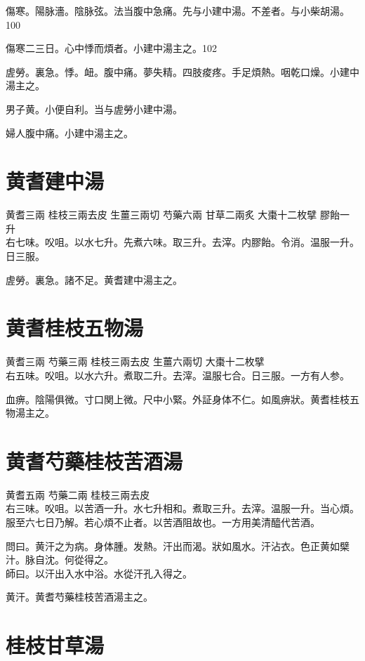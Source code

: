 傷寒。陽脉濇。陰脉弦。法当腹中急痛。先与小建中湯。不差者。与小柴胡湯。100

傷寒二三日。心中悸而煩者。小建中湯主之。102

虗勞。裏急。悸。衄。腹中痛。夢失精。四肢痠疼。手足煩熱。咽乾口燥。小建中湯主之。

男子黄。小便自利。当与虗勞小建中湯。

婦人腹中痛。小建中湯主之。

\section{黄耆建中湯}

黄耆{\scriptsize 三兩} 桂枝{\scriptsize 三兩去皮} 生薑{\scriptsize 三兩切} 芍藥{\scriptsize 六兩} 甘草{\scriptsize 二兩炙} 大棗{\scriptsize 十二枚擘} 膠飴{\scriptsize 一升}\\
右七味。㕮咀。以水七升。先煮六味。取三升。去滓。内膠飴。令消。温服一升。日三服。

虗勞。裏急。諸不足。黄耆建中湯主之。

\section{黄耆桂枝五物湯}

黄耆{\scriptsize 三兩} 芍藥{\scriptsize 三兩} 桂枝{\scriptsize 三兩去皮} 生薑{\scriptsize 六兩切} 大棗{\scriptsize 十二枚擘}\\
右五味。㕮咀。以水六升。煮取二升。去滓。温服七合。日三服。{\scriptsize 一方有人参。}

血痹。陰陽俱微。寸口関上微。尺中小緊。外証身体不仁。如風痹狀。黄耆桂枝五物湯主之。

\section{黄耆芍藥桂枝苦酒湯}

黄耆{\scriptsize 五兩} 芍藥{\scriptsize 二兩} 桂枝{\scriptsize 三兩去皮}\\
右三味。㕮咀。以苦酒一升。水七升相和。煮取三升。去滓。温服一升。当心煩。服至六七日乃解。若心煩不止者。以苦酒阻故也。{\scriptsize 一方用美清醯代苦酒。}

問曰。黄汗之为病。身体腫。发熱。汗出而渴。狀如風水。汗沾衣。色正黄如檗汁。脉自沈。何從得之。\\
師曰。以汗出入水中浴。水從汗孔入得之。

黄汗。{\khaaitp 黄}耆芍{\khaaitp 藥}桂枝苦酒湯主之。

\section{桂枝甘草湯}

